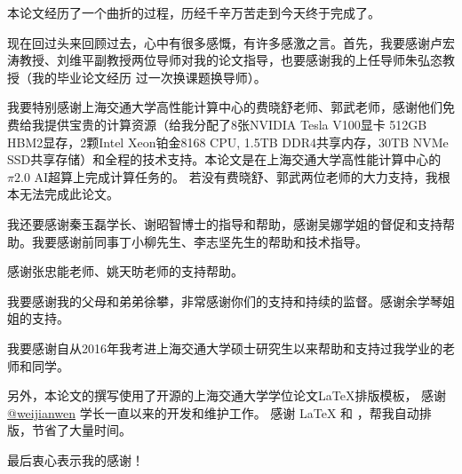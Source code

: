 
\begin{acknowledgements}
  本论文经历了一个曲折的过程，历经千辛万苦走到今天终于完成了。

  现在回过头来回顾过去，心中有很多感慨，有许多感激之言。首先，我要感谢卢宏涛教授、刘维平副教授两位导师对我的论文指导，也要感谢我的上任导师朱弘恣教授（我的毕业论文经历
  过一次换课题换导师）。

  我要特别感谢上海交通大学高性能计算中心的费晓舒老师、郭武老师，感谢他们免费给我提供宝贵的计算资源（给我分配了8张NVIDIA Tesla V100显卡 512GB HBM2显存，2颗Intel Xeon铂金8168 CPU, 
  1.5TB DDR4共享内存，30TB NVMe SSD共享存储）和全程的技术支持。本论文是在上海交通大学高性能计算中心的$\pi 2.0$ AI超算上完成计算任务的。
  若没有费晓舒、郭武两位老师的大力支持，我根本无法完成此论文。

  我还要感谢秦玉磊学长、谢昭智博士的指导和帮助，感谢吴娜学姐的督促和支持帮助。我要感谢前同事丁小柳先生、李志坚先生的帮助和技术指导。

  感谢张忠能老师、姚天昉老师的支持帮助。

  我要感谢我的父母和弟弟徐攀，非常感谢你们的支持和持续的监督。感谢余学琴姐姐的支持。

  我要感谢自从2016年我考进上海交通大学硕士研究生以来帮助和支持过我学业的老师和同学。

  另外，本论文的撰写使用了开源的\href{https://github.com/sjtug/SJTUThesis}{\sjtuthesis}上海交通大学学位论文\LaTeX{}排版模板， 
  感谢 \href{https://github.com/weijianwen}{@weijianwen} 学长一直以来的开发和维护工作。
  感谢 \LaTeX{} 和 \href{https://github.com/sjtug/SJTUThesis}{\sjtuthesis}，帮我自动排版，节省了大量时间。

  最后衷心表示我的感谢！


\end{acknowledgements}
